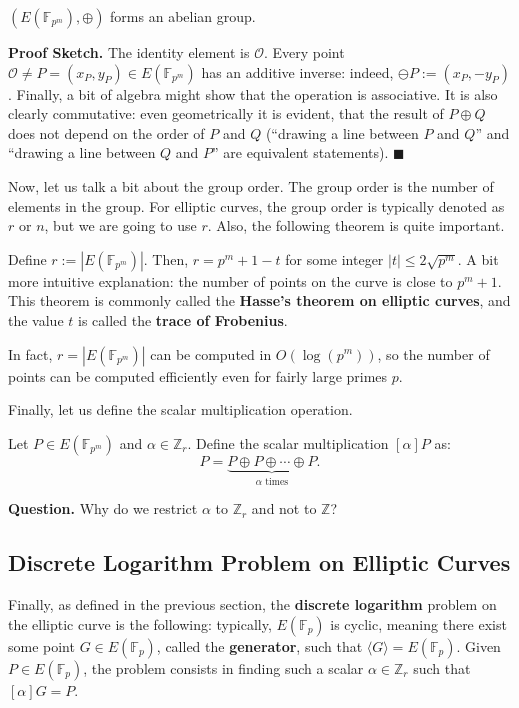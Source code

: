 \documentclass[../lecture-notes-148x210.tex]{subfiles}
\begin{document}
\begin{theorem}
    $(E(\mathbb{F}_{p^m}),\oplus)$ forms an abelian group.
\end{theorem}

\textbf{Proof Sketch.} The identity element is $\mathcal{O}$. Every point $\mathcal{O} \neq P=(x_P,y_P) \in E(\mathbb{F}_{p^m})$ has an additive inverse: indeed, $\ominus P := (x_P,-y_P)$. Finally, a bit of algebra might show that the operation is associative. It is also clearly commutative: even geometrically it is evident, that the result of $P\oplus Q$ does not depend on the order of $P$ and $Q$ (``drawing a line between $P$ and $Q$'' and ``drawing a line between $Q$ and $P$'' are equivalent statements). $\blacksquare$

Now, let us talk a bit about the group order. The group order is the number of elements in the group. For elliptic curves, the group order is typically denoted as $r$ or $n$, but we are going to use $r$. Also, the following theorem is quite important.

\begin{theorem}
    Define $r := |E(\mathbb{F}_{p^m})|$. Then, $r = p^m + 1 - t$ for some integer $|t| \leq 2\sqrt{p^m}$. A bit more intuitive explanation: the number of points on the curve is close to $p^m+1$. This theorem is commonly called the \textbf{Hasse's theorem on elliptic curves}, and the value $t$ is called the \textbf{trace of Frobenius}.
\end{theorem}

\begin{remark}
    In fact, $r=|E(\mathbb{F}_{p^m})|$ can be computed in $O(\log(p^m))$, so the number of points can be computed efficiently even for fairly large primes $p$.
\end{remark}

Finally, let us define the scalar multiplication operation. 

\begin{definition}
    Let $P \in E(\mathbb{F}_{p^m})$ and $\alpha \in \mathbb{Z}_r$. Define the scalar multiplication $[\alpha]P$ as:
    \begin{equation*}
        [\alpha]P = \underbrace{P \oplus P \oplus \cdots \oplus P}_{\alpha \text{ times}}.
    \end{equation*}
\end{definition}

\textbf{Question.} Why do we restrict $\alpha$ to $\mathbb{Z}_r$ and not to $\mathbb{Z}$?

\subsection{Discrete Logarithm Problem on Elliptic Curves}
Finally, as defined in the previous section, the \textbf{discrete logarithm} problem on the elliptic curve \cite[section 15]{Dan_Boneh_2023} is the following: typically, $E(\mathbb{F}_p)$ is cyclic, meaning there exist some point $G \in E(\mathbb{F}_p)$, called the \textbf{generator}, such that $\langle G \rangle = E(\mathbb{F}_p)$. Given $P \in E(\mathbb{F}_p)$, the problem consists in finding such a scalar $\alpha \in \mathbb{Z}_r$ such that $[\alpha]G = P$. 
\end{document}
